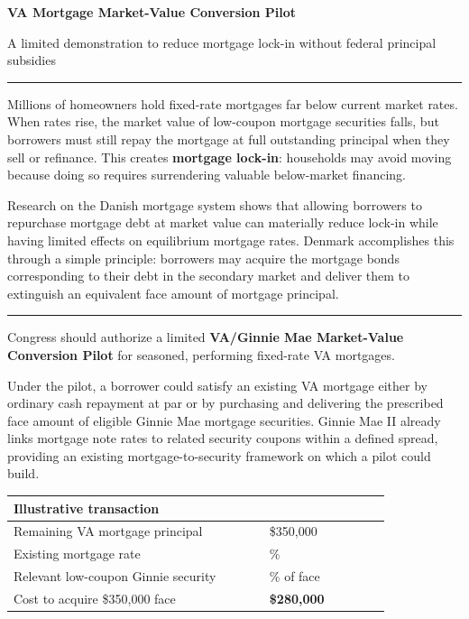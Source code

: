 \documentclass[10pt]{article}
\newcommand{\sectionline}[1]{\vspace{2.5pt}{\color{accent}\bfseries\small #1}\par\vspace{1.2pt}\hrule\vspace{2.5pt}}
\begin{document}
{\fontsize{18.5}{20.5}\selectfont\bfseries VA Mortgage Market-Value Conversion Pilot}\par
\vspace{1pt}
{\large\color{accent}A limited demonstration to reduce mortgage lock-in without federal principal subsidies}\par
\vspace{5pt}

\sectionline{Problem}
Millions of homeowners hold fixed-rate mortgages far below current market rates. When rates rise, the market value of low-coupon mortgage securities falls, but borrowers must still repay the mortgage at full outstanding principal when they sell or refinance. This creates \textbf{mortgage lock-in}: households may avoid moving because doing so requires surrendering valuable below-market financing.

Research on the Danish mortgage system shows that allowing borrowers to repurchase mortgage debt at market value can materially reduce lock-in while having limited effects on equilibrium mortgage rates.\autocite{berger2026,berg2018} Denmark accomplishes this through a simple principle: borrowers may acquire the mortgage bonds corresponding to their debt in the secondary market and deliver them to extinguish an equivalent face amount of mortgage principal.

\sectionline{Proposal}
Congress should authorize a limited \textbf{VA/Ginnie Mae Market-Value Conversion Pilot} for seasoned, performing fixed-rate VA mortgages.

Under the pilot, a borrower could satisfy an existing VA mortgage either by ordinary cash repayment at par or by purchasing and delivering the prescribed face amount of eligible Ginnie Mae mortgage securities. Ginnie Mae II already links mortgage note rates to related security coupons within a defined spread, providing an existing mortgage-to-security framework on which a pilot could build.\autocite{ginnie24}

\begin{center}
\renewcommand{\arraystretch}{1.03}
\begin{tabular}{>{\raggedright\arraybackslash}p{0.58\linewidth} >{\raggedleft\arraybackslash}p{0.27\linewidth}}
\toprule
\textbf{Illustrative transaction} & \\
\midrule
Remaining VA mortgage principal & \$350,000 \\
Existing mortgage rate & 2.25\% \\
Relevant low-coupon Ginnie security & 80\% of face \\
Cost to acquire \$350,000 face & \textbf{\$280,000} \\
\bottomrule
\end{tabular}
\end{center}
\end{document}
